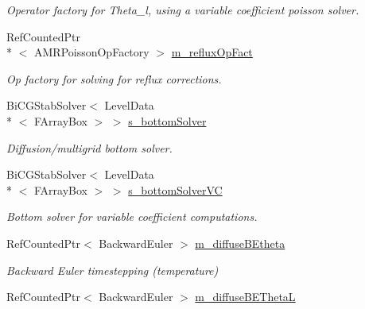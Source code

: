 \begin{DoxyCompactItemize}
\begin{DoxyCompactList}\small\item\em Operator factory for Theta\-\_\-l, using a variable coefficient poisson solver. \end{DoxyCompactList}\item 
\hypertarget{classamr_mushy_layer_ade8ca78b02cb578fc70950085684e1f0}{Ref\-Counted\-Ptr\\*
$<$ A\-M\-R\-Poisson\-Op\-Factory $>$ \hyperlink{classamr_mushy_layer_ade8ca78b02cb578fc70950085684e1f0}{m\-\_\-reflux\-Op\-Fact}}\label{classamr_mushy_layer_ade8ca78b02cb578fc70950085684e1f0}

\begin{DoxyCompactList}\small\item\em Op factory for solving for reflux corrections. \end{DoxyCompactList}\item 
\hypertarget{classamr_mushy_layer_a5f152d446e12a98e9674c89f9e98f307}{Bi\-C\-G\-Stab\-Solver$<$ Level\-Data\\*
$<$ F\-Array\-Box $>$ $>$ \hyperlink{classamr_mushy_layer_a5f152d446e12a98e9674c89f9e98f307}{s\-\_\-bottom\-Solver}}\label{classamr_mushy_layer_a5f152d446e12a98e9674c89f9e98f307}

\begin{DoxyCompactList}\small\item\em Diffusion/multigrid bottom solver. \end{DoxyCompactList}\item 
\hypertarget{classamr_mushy_layer_a5a3f686e3be5da3df1c2b437cc46838d}{Bi\-C\-G\-Stab\-Solver$<$ Level\-Data\\*
$<$ F\-Array\-Box $>$ $>$ \hyperlink{classamr_mushy_layer_a5a3f686e3be5da3df1c2b437cc46838d}{s\-\_\-bottom\-Solver\-V\-C}}\label{classamr_mushy_layer_a5a3f686e3be5da3df1c2b437cc46838d}

\begin{DoxyCompactList}\small\item\em Bottom solver for variable coefficient computations. \end{DoxyCompactList}\item 
\hypertarget{classamr_mushy_layer_ad17d3ac7f4d28c0de852e9a7995c88a4}{Ref\-Counted\-Ptr$<$ Backward\-Euler $>$ \hyperlink{classamr_mushy_layer_ad17d3ac7f4d28c0de852e9a7995c88a4}{m\-\_\-diffuse\-B\-Etheta}}\label{classamr_mushy_layer_ad17d3ac7f4d28c0de852e9a7995c88a4}

\begin{DoxyCompactList}\small\item\em Backward Euler timestepping (temperature) \end{DoxyCompactList}\item 
\hypertarget{classamr_mushy_layer_a0f43e7e22f667c53c6a12600dc13f17d}{Ref\-Counted\-Ptr$<$ Backward\-Euler $>$ \hyperlink{classamr_mushy_layer_a0f43e7e22f667c53c6a12600dc13f17d}{m\-\_\-diffuse\-B\-E\-Theta\-L}}\label{classamr_mushy_layer_a0f43e7e22f667c53c6a12600dc13f17d}


\end{DoxyCompactItemize}
